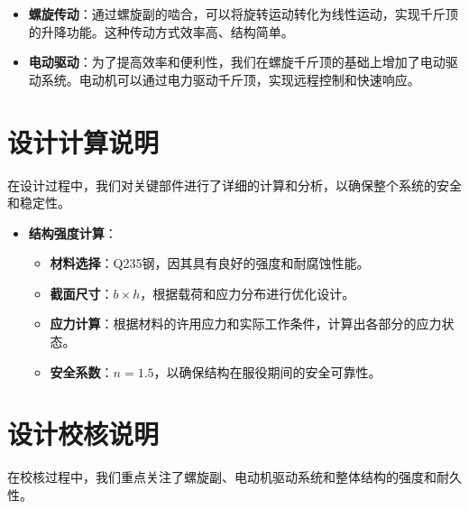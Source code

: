 \documentclass[12pt, a4paper, oneside]{ctexart}
\begin{document}
\begin{itemize}
  \item \textbf{螺旋传动}：通过螺旋副的啮合，可以将旋转运动转化为线性运动，实现千斤顶的升降功能。这种传动方式效率高、结构简单。
  \item \textbf{电动驱动}：为了提高效率和便利性，我们在螺旋千斤顶的基础上增加了电动驱动系统。电动机可以通过电力驱动千斤顶，实现远程控制和快速响应。
\end{itemize}

\section{设计计算说明}
在设计过程中，我们对关键部件进行了详细的计算和分析，以确保整个系统的安全和稳定性。

\begin{itemize}
  \item \textbf{结构强度计算}：
    \begin{itemize}
    \item \textbf{材料选择}：Q235钢，因其具有良好的强度和耐腐蚀性能。
    \item \textbf{截面尺寸}：$b \times h$，根据载荷和应力分布进行优化设计。
    \item \textbf{应力计算}：根据材料的许用应力和实际工作条件，计算出各部分的应力状态。
    \item \textbf{安全系数}：$n = 1.5$，以确保结构在服役期间的安全可靠性。
    \end{itemize}
\end{itemize}

\section{设计校核说明}
在校核过程中，我们重点关注了螺旋副、电动机驱动系统和整体结构的强度和耐久性。
\end{document}
